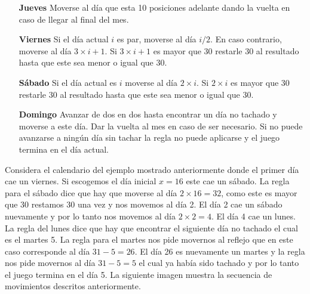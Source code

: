 \documentclass{oci}
\begin{document}
\begin{problemDescription}
\begin{itemize}
    \item[\bf Jueves] Moverse al día que esta 10 posiciones adelante dando la vuelta en caso de
    llegar al final del mes.

    \item[\bf Viernes] Si el día actual $i$ es par, moverse al día $i/2$.
    En caso contrario, moverse al día $3\times i + 1$.
    Si $3\times i + 1$ es mayor que 30 restarle 30 al resultado hasta que este sea menor o igual que 30.

    \item[\bf Sábado] Si el día actual es $i$ moverse al día $2\times i$.
    Si $2\times i$ es mayor que 30 restarle 30 al resultado hasta que este sea menor o igual que 30.

    \item[\bf Domingo] Avanzar de dos en dos hasta encontrar un día no tachado y moverse a este día.
    Dar la vuelta al mes en caso de ser necesario.
    Si no puede avanzarse a ningún día sin tachar la regla no puede aplicarse y el juego termina en el día actual.
  \end{itemize}

  Considera el calendario del ejemplo mostrado anteriormente donde el primer día cae un viernes.
  Si escogemos el día inicial $x=16$ este cae un sábado.
  La regla para el sábado dice que hay que moverse al día $2\times 16 = 32$, como este es mayor que 30
  restamos 30 una vez y nos movemos al día 2.
  El día 2 cae un sábado nuevamente y por lo tanto nos movemos al día $2\times 2=4$.
  El día 4 cae un lunes.
  La regla del lunes dice que hay que encontrar el siguiente día no tachado el cual es el martes 5.
  La regla para el martes nos pide movernos al reflejo que en este caso corresponde al día $31 - 5 = 26$.
  El día 26 es nuevamente un martes y la regla nos pide movernos al día $31 - 5 = 5$ el cual ya había
  sido tachado y por lo tanto el juego termina en el día 5.
  La siguiente imagen muestra la secuencia de movimientos descritos anteriormente.


\end{problemDescription}
\end{document}
